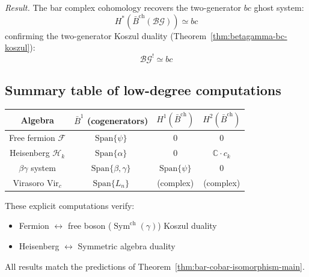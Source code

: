 \emph{Result.} The bar complex cohomology recovers the two-generator $bc$ ghost system:
\[H^*(\bar{B}^{\text{ch}}(\mathcal{BG})) \simeq bc\]
confirming the two-generator Koszul duality (Theorem~\ref{thm:betagamma-bc-koszul}):
\[\mathcal{BG}^! \simeq bc\]

\subsection{Summary table of low-degree computations}

\begin{center}
\begin{tabular}{c|c|c|c}
\textbf{Algebra} & $\bar{B}^1$ (cogenerators) & $H^1(\bar{B}^{\mathrm{ch}})$ & $H^2(\bar{B}^{\mathrm{ch}})$ \\ \hline
Free fermion $\mathcal{F}$ & $\text{Span}\{\psi\}$ & 0 & 0 \\
Heisenberg $\mathcal{H}_k$ & $\text{Span}\{\alpha\}$ & 0 & $\mathbb{C} \cdot c_k$ \\
$\beta\gamma$ system & $\text{Span}\{\beta,\gamma\}$ & $\text{Span}\{\psi\}$ & 0 \\
Virasoro $\text{Vir}_c$ & $\text{Span}\{L_n\}$ & (complex) & (complex)
\end{tabular}
\end{center}

These explicit computations verify:
\begin{itemize}
\item Fermion $\leftrightarrow$ free boson ($\operatorname{Sym}^{\mathrm{ch}}(\gamma)$) Koszul duality
\item Heisenberg $\leftrightarrow$ Symmetric algebra duality
\end{itemize}

All results match the predictions of Theorem~\ref{thm:bar-cobar-isomorphism-main}.
